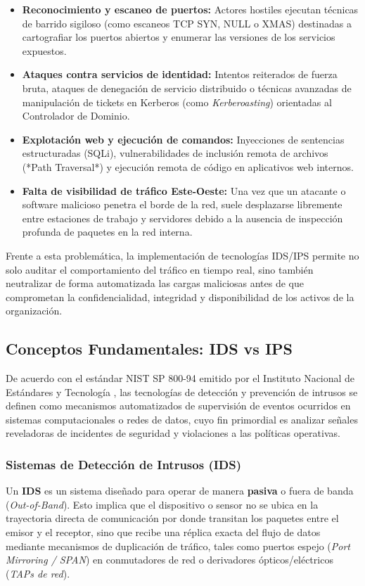 \begin{itemize}
  \item \textbf{Reconocimiento y escaneo de puertos:} Actores hostiles ejecutan técnicas de barrido sigiloso (como escaneos TCP SYN, NULL o XMAS) destinadas a cartografiar los puertos abiertos y enumerar las versiones de los servicios expuestos.
  \item \textbf{Ataques contra servicios de identidad:} Intentos reiterados de fuerza bruta, ataques de denegación de servicio distribuido o técnicas avanzadas de manipulación de tickets en Kerberos (como \textit{Kerberoasting}) orientadas al Controlador de Dominio.
  \item \textbf{Explotación web y ejecución de comandos:} Inyecciones de sentencias estructuradas (SQLi), vulnerabilidades de inclusión remota de archivos (*Path Traversal*) y ejecución remota de código en aplicativos web internos.
  \item \textbf{Falta de visibilidad de tráfico Este-Oeste:} Una vez que un atacante o software malicioso penetra el borde de la red, suele desplazarse libremente entre estaciones de trabajo y servidores debido a la ausencia de inspección profunda de paquetes en la red interna.
\end{itemize}

Frente a esta problemática, la implementación de tecnologías IDS/IPS permite no solo auditar el comportamiento del tráfico en tiempo real, sino también neutralizar de forma automatizada las cargas maliciosas antes de que comprometan la confidencialidad, integridad y disponibilidad de los activos de la organización.

\subsection{Conceptos Fundamentales: IDS vs IPS}

De acuerdo con el estándar NIST SP 800-94 emitido por el Instituto Nacional de Estándares y Tecnología \citep{nist_idps_2007}, las tecnologías de detección y prevención de intrusos se definen como mecanismos automatizados de supervisión de eventos ocurridos en sistemas computacionales o redes de datos, cuyo fin primordial es analizar señales reveladoras de incidentes de seguridad y violaciones a las políticas operativas.

\subsubsection{Sistemas de Detección de Intrusos (IDS)}
Un \textbf{IDS} es un sistema diseñado para operar de manera \textbf{pasiva} o fuera de banda (\textit{Out-of-Band}). Esto implica que el dispositivo o sensor no se ubica en la trayectoria directa de comunicación por donde transitan los paquetes entre el emisor y el receptor, sino que recibe una réplica exacta del flujo de datos mediante mecanismos de duplicación de tráfico, tales como puertos espejo (\textit{Port Mirroring / SPAN}) en conmutadores de red o derivadores ópticos/eléctricos (\textit{TAPs de red}).

